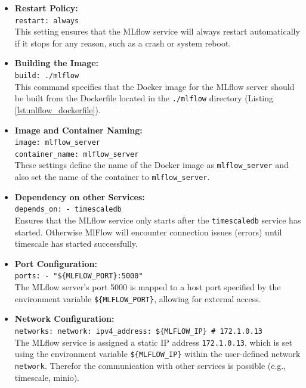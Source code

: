 \begin{itemize}
    \item \textbf{Restart Policy:} \\
    \verb|restart: always| \\
    This setting ensures that the MLflow service will always restart automatically if it stops for any reason, such as a crash or system reboot.

    \item \textbf{Building the Image:} \\
    \verb|build: ./mlflow| \\
    This command specifies that the Docker image for the MLflow server should be built from the Dockerfile located in the \texttt{./mlflow} directory (Listing \ref{lst:mlflow_dockerfile}).

    \item \textbf{Image and Container Naming:} \\
    \verb|image: mlflow_server| \\
    \verb|container_name: mlflow_server| \\
    These settings define the name of the Docker image as \texttt{mlflow\_server} and also set the name of the container to \texttt{mlflow\_server}.

    \item \textbf{Dependency on other Services:} \\
    \verb|depends_on: - timescaledb| \\
    Ensures that the MLflow service only starts after the \texttt{timescaledb} service has started. Otherwise MlFlow will encounter connection issues (errors) until timescale has started successfully.

    \item \textbf{Port Configuration:} \\
    \verb|ports: - "${MLFLOW_PORT}:5000"| \\
    The MLflow server's port 5000 is mapped to a host port specified by the environment variable \texttt{\$\{MLFLOW\_PORT\}}, allowing for external access.

    \item \textbf{Network Configuration:} \\
    \verb|networks: network: ipv4_address: ${MLFLOW_IP} # 172.1.0.13| \\
    The MLflow service is assigned a static IP address \texttt{172.1.0.13}, which is set using the environment variable \texttt{\$\{MLFLOW\_IP\}} within the user-defined network \texttt{network}. Therefor the communication with other services is possible (e.g., timescale, minio).


\end{itemize}
